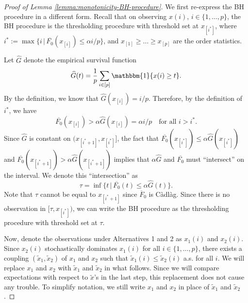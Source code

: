 \begin{proof}[Proof of Lemma \ref{lemma:monotonicity-BH-procedure}]
We first re-express the BH procedure in a different form.
Recall that on observing $x(i)$, $i\in\{1,\ldots,p\}$, the BH procedure is the thresholding procedure with threshold set at $x_{[i^*]}$, where $i^* := \max\{i\,|\,\overline{F_0}(x_{[i]})\le \alpha i/p\}$, and $x_{[1]}\ge\ldots\ge x_{[p]}$ are the order statistics.

Let $\widehat{G}$ denote the empirical survival function
\begin{equation} \label{eq:empirical-tail-distribution}
    \widehat{G}(t) = \frac{1}{p}\sum_{i\in[p]}\mathbbm{1}\{x(i) \ge t\}.
\end{equation}
By the definition, we know that $\widehat{G}(x_{[i]}) = i/p$.
Therefore, by the definition of $i^*$, we have
\begin{equation*} 
    \overline{F_0}(x_{[i]}) > \alpha\widehat{G}(x_{[i]}) = \alpha i/p \quad \text{for all }i>i^*.
\end{equation*}
Since $\widehat{G}$ is constant on $(x_{[i^*+1]}, x_{[i^*]}]$, the fact that 
$\overline{F_0}(x_{[i^*]}) \le \alpha\widehat{G}(x_{[i^*]})$ and $\overline{F_0}(x_{[i^*+1]}) > \alpha\widehat{G}(x_{[i^*+1]})$ implies that $\alpha\widehat{G}$ and $\overline{F_0}$ must ``intersect'' on the interval.
We denote this ``intersection'' as
\begin{equation} \label{eq:weak-boundary-proof-tau}
    \tau = \inf\{t\,|\,\overline{F_0}(t)\le\alpha\widehat{G}(t)\}. 
\end{equation}
Note that $\tau$ cannot be equal to $x_{[i^*+1]}$ since $\overline{F}_0$ is C\`adl\`ag.
Since there is no observation in $[\tau, x_{[i^*]})$, we can write the BH procedure as the thresholding procedure with threshold set at $\tau$.

Now, denote the observations under Alternatives 1 and 2 as $x_1(i)$ and $x_2(i)$.
Since $x_2(i)$ stochastically dominates $x_1(i)$ for all $i\in\{1,\ldots,p\}$, there exists a coupling $(\widetilde{x}_1, \widetilde{x}_2)$ of $x_1$ and $x_2$ such that 
$\widetilde{x}_1(i) \le \widetilde{x}_2(i)$ a.s. for all $i$.
We will replace $x_1$ and $x_2$ with $\widetilde{x}_1$ and $\widetilde{x}_2$ in what follows.
Since we will compare expectations with respect to $\widetilde{x}$'s in the last step, this replacement does not cause any trouble.
To simplify notation, we still write $x_1$ and $x_2$ in place of $\widetilde{x}_1$ and $\widetilde{x}_2$.


\end{proof}
